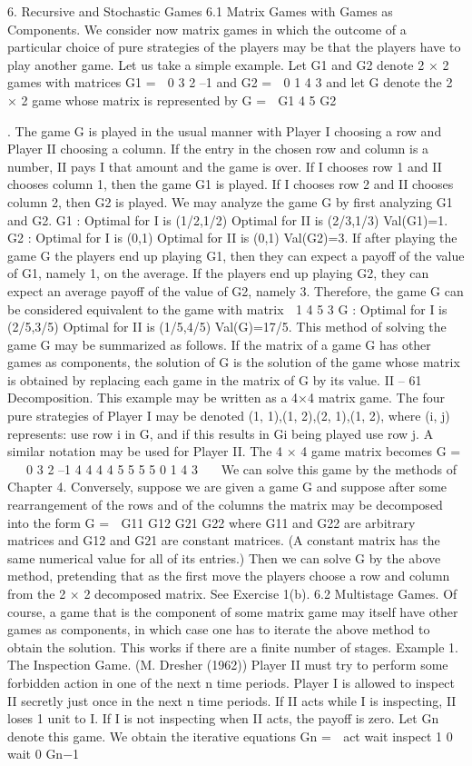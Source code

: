 6. Recursive and Stochastic Games
6.1 Matrix Games with Games as Components. We consider now matrix games
in which the outcome of a particular choice of pure strategies of the players may be that
the players have to play another game. Let us take a simple example.
Let G1 and G2 denote 2 × 2 games with matrices
G1 =
 0 3
2 –1
and G2 =
 0 1
4 3
and let G denote the 2 × 2 game whose matrix is represented by
G =
 G1 4
5 G2

.
The game G is played in the usual manner with Player I choosing a row and Player II
choosing a column. If the entry in the chosen row and column is a number, II pays I that
amount and the game is over. If I chooses row 1 and II chooses column 1, then the game
G1 is played. If I chooses row 2 and II chooses column 2, then G2 is played.
We may analyze the game G by first analyzing G1 and G2.
G1 : Optimal for I is (1/2,1/2)
Optimal for II is (2/3,1/3)
Val(G1)=1.
G2 : Optimal for I is (0,1)
Optimal for II is (0,1)
Val(G2)=3.
If after playing the game G the players end up playing G1, then they can expect a payoff
of the value of G1, namely 1, on the average. If the players end up playing G2, they can
expect an average payoff of the value of G2, namely 3. Therefore, the game G can be
considered equivalent to the game with matrix
 1 4
5 3
G :
Optimal for I is (2/5,3/5)
Optimal for II is (1/5,4/5)
Val(G)=17/5.
This method of solving the game G may be summarized as follows. If the matrix of
a game G has other games as components, the solution of G is the solution of the game
whose matrix is obtained by replacing each game in the matrix of G by its value.
II – 61
Decomposition. This example may be written as a 4×4 matrix game. The four pure
strategies of Player I may be denoted {(1, 1),(1, 2),(2, 1),(1, 2)}, where (i, j) represents:
use row i in G, and if this results in Gi being played use row j. A similar notation may
be used for Player II. The 4 × 4 game matrix becomes
G =
⎛
⎜⎝
0 3
2 –1
4 4
4 4
5 5
5 5
0 1
4 3
⎞
⎟⎠
We can solve this game by the methods of Chapter 4.
Conversely, suppose we are given a game G and suppose after some rearrangement of
the rows and of the columns the matrix may be decomposed into the form
G =
 G11 G12
G21 G22
where G11 and G22 are arbitrary matrices and G12 and G21 are constant matrices. (A
constant matrix has the same numerical value for all of its entries.) Then we can solve
G by the above method, pretending that as the first move the players choose a row and
column from the 2 × 2 decomposed matrix. See Exercise 1(b).
6.2 Multistage Games. Of course, a game that is the component of some matrix
game may itself have other games as components, in which case one has to iterate the
above method to obtain the solution. This works if there are a finite number of stages.
Example 1. The Inspection Game. (M. Dresher (1962)) Player II must try to perform
some forbidden action in one of the next n time periods. Player I is allowed to inspect II
secretly just once in the next n time periods. If II acts while I is inspecting, II loses 1 unit
to I. If I is not inspecting when II acts, the payoff is zero.
Let Gn denote this game. We obtain the iterative equations
Gn =

act wait
inspect 1 0
wait 0 Gn−1

